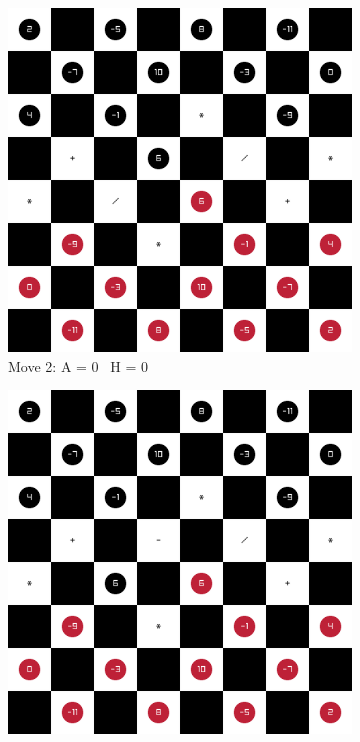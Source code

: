 \begin{figure}[H]
\begin{subfigure}{0.3\textwidth}
        \includegraphics[width=\textwidth]{images/games/game1/move_3.png}
        \caption*{Move 2: A = 0 \textbar\ H = 0}
    \end{subfigure}
    \quad
    \begin{subfigure}{0.3\textwidth}
        \centering
        \includegraphics[width=\textwidth]{images/games/game1/move_4.png}

\end{subfigure}
\end{figure}

